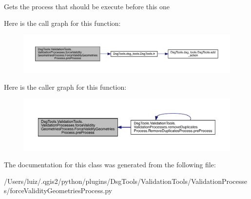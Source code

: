 \begin{DoxyVerb}Gets the process that should be execute before this one
\end{DoxyVerb}
 Here is the call graph for this function\+:
\nopagebreak
\begin{figure}[H]
\begin{center}
\leavevmode
\includegraphics[width=350pt]{class_dsg_tools_1_1_validation_tools_1_1_validation_processes_1_1force_validity_geometries_proceb6c6e9dee7ed1346c8f2b65740bae4ad_a655c76d0d7012563fcea05c9049039d7_cgraph}
\end{center}
\end{figure}
Here is the caller graph for this function\+:
\nopagebreak
\begin{figure}[H]
\begin{center}
\leavevmode
\includegraphics[width=350pt]{class_dsg_tools_1_1_validation_tools_1_1_validation_processes_1_1force_validity_geometries_proceb6c6e9dee7ed1346c8f2b65740bae4ad_a655c76d0d7012563fcea05c9049039d7_icgraph}
\end{center}
\end{figure}


The documentation for this class was generated from the following file\+:\begin{DoxyCompactItemize}
\item 
/\+Users/luiz/.\+qgis2/python/plugins/\+Dsg\+Tools/\+Validation\+Tools/\+Validation\+Processes/force\+Validity\+Geometries\+Process.\+py\end{DoxyCompactItemize}
